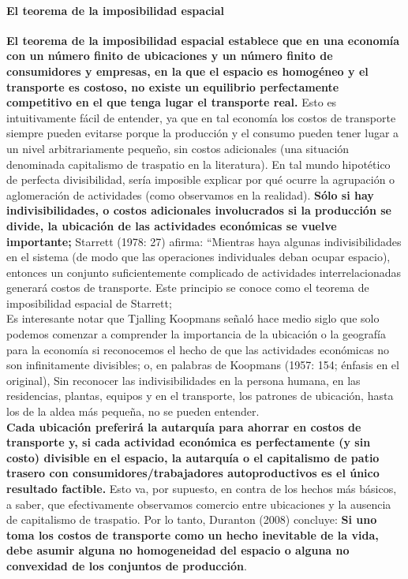 \paragraph{El teorema de la imposibilidad espacial}
\textbf{El teorema de la imposibilidad espacial establece que en una economía con un número finito de ubicaciones y un número finito de consumidores y empresas, en la que el espacio es homogéneo y el transporte es costoso, no existe un equilibrio perfectamente competitivo en el que tenga lugar el transporte real.} Esto es intuitivamente fácil de entender, ya que en tal economía los costos de transporte siempre pueden evitarse porque la producción y el consumo pueden tener lugar a un nivel arbitrariamente pequeño, sin costos adicionales (una situación denominada capitalismo de traspatio en la literatura). En tal mundo hipotético de perfecta divisibilidad, sería imposible explicar por qué ocurre la agrupación o aglomeración de actividades (como observamos en la realidad). \textbf{Sólo si hay indivisibilidades, o costos adicionales involucrados si la producción se divide, la ubicación de las actividades económicas se vuelve importante;} Starrett (1978: 27) afirma: “Mientras haya algunas indivisibilidades en el sistema (de modo que las operaciones individuales deban ocupar espacio), entonces un conjunto suficientemente complicado de actividades interrelacionadas generará costos de transporte. Este principio se conoce como el teorema de imposibilidad espacial de Starrett; \\
Es interesante notar que Tjalling Koopmans señaló hace medio siglo que solo podemos comenzar a comprender la importancia de la ubicación o la geografía para la economía si reconocemos el hecho de que las actividades económicas no son infinitamente divisibles; o, en palabras de Koopmans (1957: 154; énfasis en el original), Sin reconocer las indivisibilidades en la persona humana, en las residencias, plantas, equipos y en el transporte, los patrones de ubicación, hasta los de la aldea más pequeña, no se pueden entender.\\
\textbf{Cada ubicación preferirá la autarquía para ahorrar en costos de transporte y, si cada actividad económica es perfectamente (y sin costo) divisible en el espacio, la autarquía o el capitalismo de patio trasero con consumidores/trabajadores autoproductivos es el único resultado factible.} Esto va, por supuesto, en contra de los hechos más básicos, a saber, que efectivamente observamos comercio entre ubicaciones y la ausencia de capitalismo de traspatio. Por lo tanto, Duranton (2008) concluye: \textbf{Si uno toma los costos de transporte como un hecho inevitable de la vida, debe asumir alguna no homogeneidad del espacio o alguna no convexidad de los conjuntos de producción}.

